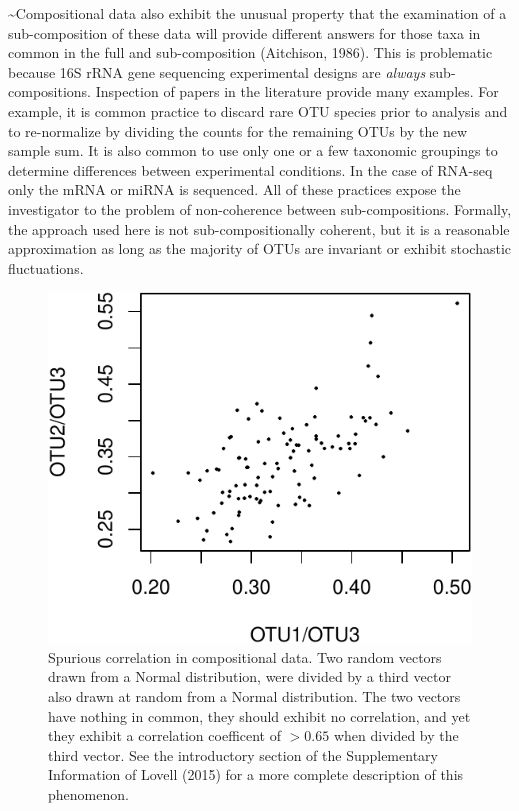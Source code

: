 \documentclass[twocolumn]{article}
\begin{document}
\textasciitilde{}Compositional data also exhibit the unusual property
that the examination of a sub-composition of these data will provide
different answers for those taxa in common in the full and
sub-composition (Aitchison, 1986). This is problematic because 16S rRNA
gene sequencing experimental designs are \emph{always} sub-compositions.
Inspection of papers in the literature provide many examples. For
example, it is common practice to discard rare OTU species prior to
analysis and to re-normalize by dividing the counts for the remaining
OTUs by the new sample sum. It is also common to use only one or a few
taxonomic groupings to determine differences between experimental
conditions. In the case of RNA-seq only the mRNA or miRNA is sequenced.
All of these practices expose the investigator to the problem of
non-coherence between sub-compositions. Formally, the approach used here
is not sub-compositionally coherent, but it is a reasonable
approximation as long as the majority of OTUs are invariant or exhibit
stochastic fluctuations.

\begin{figure}[htbp]
\centering
\includegraphics{main_files/figure-latex/R_block_correlation-1.pdf}
\caption{\label{correlation} Spurious correlation in compositional data.
Two random vectors drawn from a Normal distribution, were divided by a
third vector also drawn at random from a Normal distribution. The two
vectors have nothing in common, they should exhibit no correlation, and
yet they exhibit a correlation coefficent of \(>0.65\) when divided by
the third vector. See the introductory section of the Supplementary
Information of Lovell (2015) for a more complete description of this
phenomenon.}
\end{figure}
\end{document}
